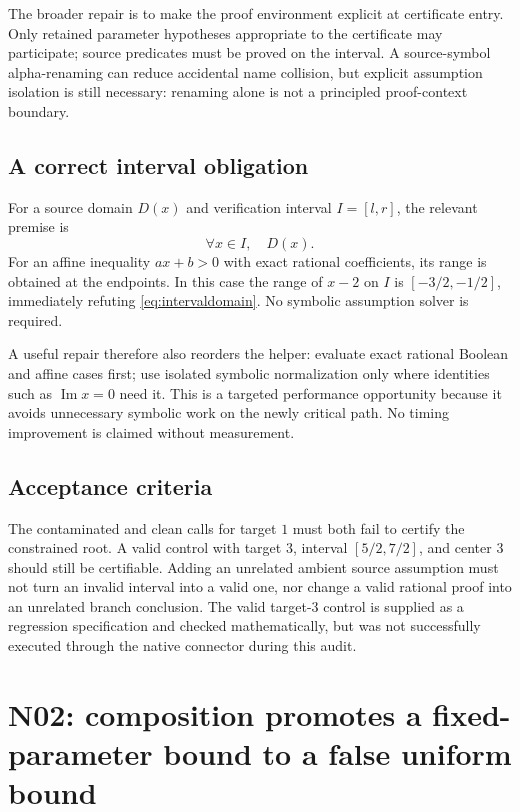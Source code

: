 \documentclass[11pt,letterpaper]{article}
\begin{document}
The broader repair is to make the proof environment explicit at certificate entry. Only retained parameter hypotheses appropriate to the certificate may participate; source predicates must be proved on the interval. A source-symbol alpha-renaming can reduce accidental name collision, but explicit assumption isolation is still necessary: renaming alone is not a principled proof-context boundary.

\subsection{A correct interval obligation}
For a source domain $D(x)$ and verification interval $I=[l,r]$, the relevant premise is
\begin{equation}\label{eq:intervaldomain}
 \forall x\in I,\quad D(x).
\end{equation}
For an affine inequality $ax+b>0$ with exact rational coefficients, its range is obtained at the endpoints. In this case the range of $x-2$ on $I$ is $[-3/2,-1/2]$, immediately refuting \eqref{eq:intervaldomain}. No symbolic assumption solver is required.

A useful repair therefore also reorders the helper: evaluate exact rational Boolean and affine cases first; use isolated symbolic normalization only where identities such as $\operatorname{Im}x=0$ need it. This is a targeted performance opportunity because it avoids unnecessary symbolic work on the newly critical path. No timing improvement is claimed without measurement.

\subsection{Acceptance criteria}
The contaminated and clean calls for target $1$ must both fail to certify the constrained root. A valid control with target $3$, interval $[5/2,7/2]$, and center $3$ should still be certifiable. Adding an unrelated ambient source assumption must not turn an invalid interval into a valid one, nor change a valid rational proof into an unrelated branch conclusion. The valid target-$3$ control is supplied as a regression specification and checked mathematically, but was not successfully executed through the native connector during this audit.

\section{N02: composition promotes a fixed-parameter bound to a false uniform bound}\label{sec:n02}
\end{document}

